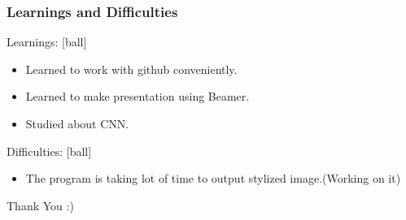 \documentclass[14pt]{beamer}
\begin{document}
\begin{frame}
		\frametitle{Learnings and Difficulties}
		Learnings:
        \begin{itemize}
		\item Learned to work with github conveniently.
		\item Learned to make presentation using Beamer.
		\item Studied about CNN.
		\end{itemize}
		Difficulties:
        \begin{itemize}
				\item The program is taking lot of time to output stylized image.(Working on it)
		\end{itemize}
\end{frame}

\begin{frame}
		Thank You :)
\end{frame}
\end{document}
